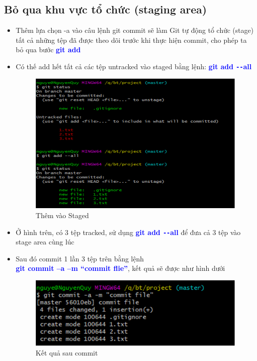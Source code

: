 \documentclass[12pt,a4paper]{report}
\begin{document}
\subsection{Bỏ qua khu vực tổ chức (staging area)}
\begin{itemize}
\item Thêm lựa chọn -a vào câu lệnh git commit sẽ làm Git tự động tổ chức (stage) tất cả những tệp đã được theo dõi trước khi thực hiện commit, cho phép ta bỏ qua bước \textcolor{blue}{\bf git add}
\item Có thế add hết tất cả các tệp untracked vào staged bằng lệnh: \textcolor{blue}{\bf git add \texttt{-{}-}all}

\begin{figure}[!ht]
	\centering
	\includegraphics[width=0.8\linewidth]{screenshot013}
\caption{Thêm vào Staged}
	\label{fig:screenshot013}
\end{figure}

\item Ở hình trên, có 3 tệp tracked, sử dụng \textcolor{blue}{\bf git add \texttt{-{}-}all} để đưa cả 3 tệp vào stage area cùng lúc
\item Sau đó commit 1 lần 3 tệp trên bằng lệnh\\ \textcolor{blue}{\bf git commit –a –m “commit flie”}, kết quả sẽ được như hình dưới

\begin{figure}[!ht]
	\centering
	\includegraphics[width=0.8\linewidth]{screenshot014}
\caption{Kết quả sau commit}
	\label{fig:screenshot014}
	\end{figure}	
\end{itemize}
\end{document}
